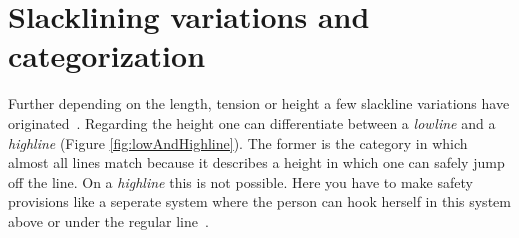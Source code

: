 \section{Slacklining variations and categorization}\label{3_2_slacklineVariations}
Further depending on the length, tension or height a few slackline variations have originated~\cite{MillerMauser2013-sl, Kleindl2011-bl, Thomann2017-ab}. Regarding the height one can differentiate between a \textit{lowline} and a \textit{highline} (Figure \ref{fig:lowAndHighline}). The former is the category in which almost all lines match because it describes a height in which one can safely jump off the line. On a \textit{highline} this is not possible. Here you have to make safety provisions like a seperate system where the person can hook herself in this system above or under the regular line~\cite{Kleindl2011-bl}.

